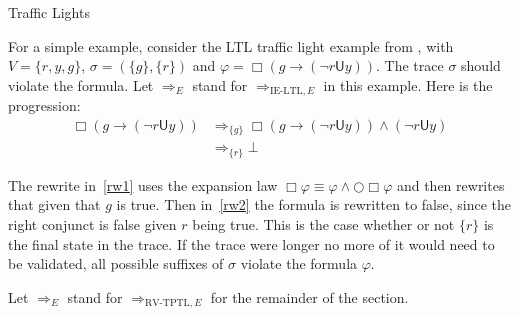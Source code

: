 \documentclass[a4paper]{article}
\newcommand{\U}{\mathsf{U}}
\newcommand{\rw}[1]{\Rightarrow_{#1}}
\begin{document}
\begin{eg}{Traffic Lights}

  For a simple example, consider the LTL traffic light example from \textcite[175]{rosu2005rewriting}, with $V=\{r,y,g\}$, $\sigma = (\{g\},\{r\})$ and $\varphi = \Box (g \to (\neg r \U y))$. The trace $\sigma$ should violate the formula. Let $\rw{E}$ stand for $\rw{\text{IE-LTL},E}$ in this example. Here is the progression:
\begin{align}
  \Box (g \to (\neg r \U y)) &\rw{\{g\}} \Box (g \to (\neg r \U y)) \land (\neg r \U y)\label{rw1}\\
  &\rw{\{r\}} \bot\label{rw2}
\end{align}

The rewrite in~\eqref{rw1} uses the expansion law $\Box \varphi \equiv \varphi \land \bigcirc \Box \varphi$ and then rewrites that given that $g$ is true.
Then in~\eqref{rw2} the formula is rewritten to false, since the right conjunct is false given $r$ being true. This is the case whether or not $\{r\}$ is the final state in the trace. If the trace were longer no more of it would need to be validated, all possible suffixes of $\sigma$ violate the formula $\varphi$.
\end{eg}

Let $\rw{E}$ stand for $\rw{\text{RV-TPTL},E}$ for the remainder of the section.
\end{document}
